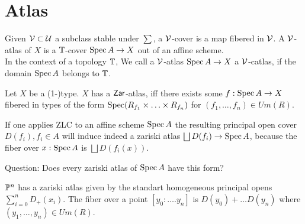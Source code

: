 \section{Atlas}
\begin{definition}{\label{def:TAtlas}}
	Given $\mathcal{V} \subset \mathcal{U}$ a subclass stable under $\sum$, a $\mathcal{V}$-cover is a map fibered in $\mathcal{V}$.
	A $\mathcal{V}$-atlas of $X$ is a $\mathbb{T}$-cover $\operatorname{Spec} A \to X$ out of an affine scheme. \\
	In the context of a topology $\mathbb{T}$, We call a $\mathcal{V}$-atlas $\operatorname{Spec} A \to X$ a $\mathcal{V}$-catlas, if the domain $\operatorname{Spec} A$ belongs to $\mathbb{T}$.
\end{definition}


\begin{example}
	Let $X$ be a (1-)type. $X$ has a $\mathsf{Zar}$-atlas, iff there exists some $f : \operatorname{Spec} A \to X$ fibered in types of the form $\operatorname{Spec} (R_{f_1} \times \hdots \times R_{f_n})$ for $(f_1,\hdots,f_n) \in Um(R)$. 
\end{example}
\begin{rmk}{\label{ZLCGivesZariski}}
	If one applies ZLC to an affine scheme $\operatorname{Spec} A$ the resulting principal open cover $D(f_i), f_i \in A$ will induce indeed a zariski atlas $\bigsqcup D(f_i) \to \operatorname{Spec} A$, because the fiber over $x : \operatorname{Spec} A$ is $\bigsqcup D(f_i(x))$.
\end{rmk}
Question: Does every zariski atlas of $\operatorname{Spec} A$ have this form? 

\begin{example}{\label{ex:PnIsStack}}
	$\mathbb{P}^n$ has a zariski atlas given by the standart homogeneous principal opens $\sum_{i=0}^n D_+(x_i)$. The fiber over a point $[y_0 : \hdots . y_n]$ is $D(y_0) + \hdots D(y_n)$ where $(y_1,\hdots,y_n) \in Um(R)$. %
\end{example}

